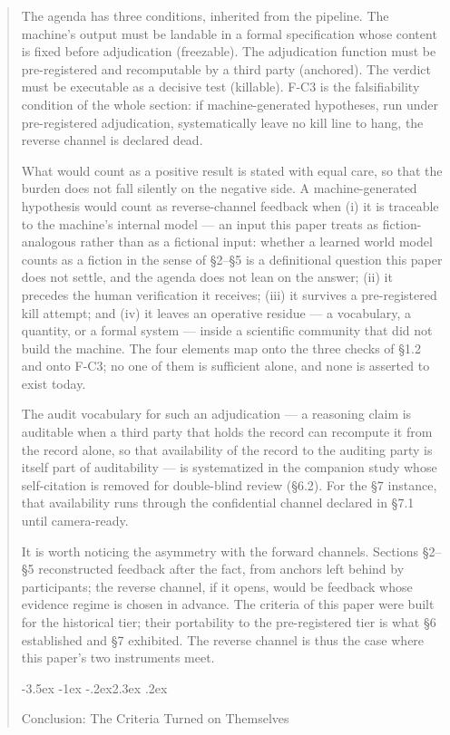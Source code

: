 \documentclass[11pt,a4paper]{article}
\makeatletter
\renewcommand\section{\@startsection{section}{1}{\z@}%
  {-3.5ex \@plus -1ex \@minus -.2ex}{2.3ex \@plus .2ex}%
  {\normalfont\Large\bfseries\raggedright}}
\makeatother
\begin{document}
\begin{abstract}
The agenda has three conditions, inherited from the pipeline. The machine's output must be landable in a formal specification whose content is fixed before adjudication (freezable). The adjudication function must be pre-registered and recomputable by a third party (anchored). The verdict must be executable as a decisive test (killable). F-C3 is the falsifiability condition of the whole section: if machine-generated hypotheses, run under pre-registered adjudication, systematically leave no kill line to hang, the reverse channel is declared dead.

What would count as a positive result is stated with equal care, so that the burden does not fall silently on the negative side. A machine-generated hypothesis would count as reverse-channel feedback when (i) it is traceable to the machine's internal model — an input this paper treats as fiction-analogous rather than as a fictional input: whether a learned world model counts as a fiction in the sense of §2–§5 is a definitional question this paper does not settle, and the agenda does not lean on the answer; (ii) it precedes the human verification it receives; (iii) it survives a pre-registered kill attempt; and (iv) it leaves an operative residue — a vocabulary, a quantity, or a formal system — inside a scientific community that did not build the machine. The four elements map onto the three checks of §1.2 and onto F-C3; no one of them is sufficient alone, and none is asserted to exist today.

The audit vocabulary for such an adjudication — a reasoning claim is auditable when a third party that holds the record can recompute it from the record alone, so that availability of the record to the auditing party is itself part of auditability — is systematized in the companion study whose self-citation is removed for double-blind review (§6.2). For the §7 instance, that availability runs through the confidential channel declared in §7.1 until camera-ready.

It is worth noticing the asymmetry with the forward channels. Sections §2–§5 reconstructed feedback after the fact, from anchors left behind by participants; the reverse channel, if it opens, would be feedback whose evidence regime is chosen in advance. The criteria of this paper were built for the historical tier; their portability to the pre-registered tier is what §6 established and §7 exhibited. The reverse channel is thus the case where this paper's two instruments meet.

\section{Conclusion: The Criteria Turned on Themselves}


\end{abstract}
\end{document}
